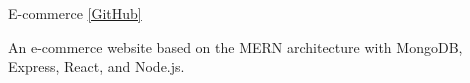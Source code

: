 \begin{cventries}
  \projectentry
    {}
    {E-commerce \href{https://github.com/bookmountain/shop-it-e-commerce-react-nodejs}{\footnotesize\color{ao}[GitHub]}} %
{}
{}
    {
      \begin{cvitems} %
        \item {An e-commerce website based on the MERN architecture with MongoDB, Express, React, and Node.js. }
      \end{cvitems}
    }
\end{cventries}
